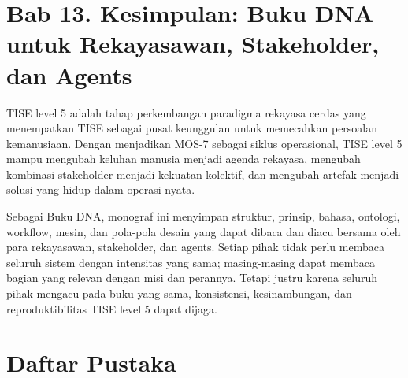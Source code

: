 \documentclass[
  letterpaper,
  DIV=11,
  numbers=noendperiod]{scrreprt}
\begin{document}

\chapter*{Bab 13. Kesimpulan: Buku DNA untuk Rekayasawan, Stakeholder,
dan
Agents}\label{bab-13.-kesimpulan-buku-dna-untuk-rekayasawan-stakeholder-dan-agents}


TISE level 5 adalah tahap perkembangan paradigma rekayasa cerdas yang
menempatkan TISE sebagai pusat keunggulan untuk memecahkan persoalan
kemanusiaan. Dengan menjadikan MOS-7 sebagai siklus operasional, TISE
level 5 mampu mengubah keluhan manusia menjadi agenda rekayasa, mengubah
kombinasi stakeholder menjadi kekuatan kolektif, dan mengubah artefak
menjadi solusi yang hidup dalam operasi nyata.

Sebagai Buku DNA, monograf ini menyimpan struktur, prinsip, bahasa,
ontologi, workflow, mesin, dan pola-pola desain yang dapat dibaca dan
diacu bersama oleh para rekayasawan, stakeholder, dan agents. Setiap
pihak tidak perlu membaca seluruh sistem dengan intensitas yang sama;
masing-masing dapat membaca bagian yang relevan dengan misi dan
perannya. Tetapi justru karena seluruh pihak mengacu pada buku yang
sama, konsistensi, kesinambungan, dan reproduktibilitas TISE level 5
dapat dijaga.


\chapter*{Daftar Pustaka}\label{daftar-pustaka}

\end{document}
